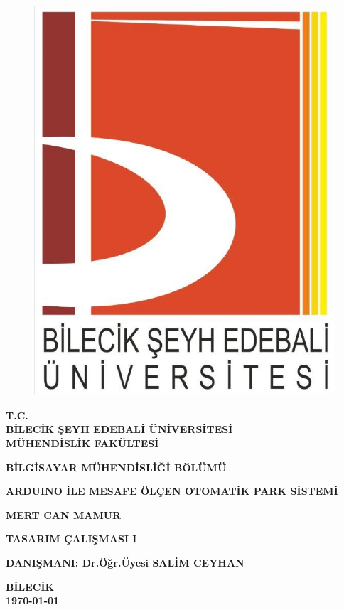 \thispagestyle{empty} 
\begin{figure}[H]
\centering
\includegraphics[scale=0.2]{logomuz}
\end{figure}
\begin{center}
\textbf{T.C.}\\
\textbf{BİLECİK ŞEYH EDEBALİ ÜNİVERSİTESİ}\\
\textbf{MÜHENDİSLİK FAKÜLTESİ}

\textbf{BİLGİSAYAR MÜHENDİSLİĞİ BÖLÜMÜ}
\end{center}

\vspace*{4cm}
\begin{center}
\textbf{ARDUINO İLE MESAFE ÖLÇEN OTOMATİK PARK SİSTEMİ}

\textbf{MERT CAN MAMUR}

\textbf{TASARIM ÇALIŞMASI I}
\end{center}

\vspace*{\fill}
\begin{center}
\textbf{DANIŞMANI: Dr.Öğr.Üyesi SALİM CEYHAN}

\textbf{BİLECİK}\\ 
\textbf{\today}
\end{center}

